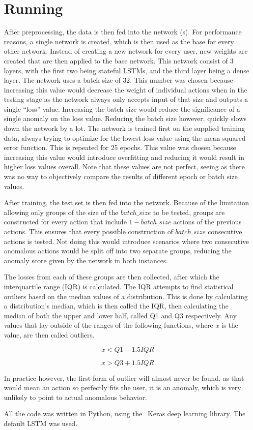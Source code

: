 \section{Running}
After preprocessing, the data is then fed into the network (s). For performance reasons, a single network is created, which is then used as the base for every other network. Instead of creating a new network for every user, new weights are created that are then applied to the base network. This network consist of 3 layers, with the first two being stateful LSTMs, and the third layer being a dense layer. The network uses a batch size of 32. This number was chosen because increasing this value would decrease the weight of individual actions when in the testing stage as the network always only accepts input of that size and outputs a single \enquote{loss} value. Increasing the batch size would reduce the significance of a single anomaly on the loss value. Reducing the batch size however, quickly slows down the network by a lot. The network is trained first on the supplied training data, always trying to optimize for the lowest loss value using the mean squared error function. This is repeated for 25 epochs. This value was chosen because increasing this value would introduce overfitting and reducing it would result in higher loss values overall. Note that these values are not perfect, seeing as there was no way to objectively compare the results of different epoch or batch size values. 

After training, the test set is then fed into the network. Because of the limitation allowing only groups of the size of the $batch\_size$ to be tested, groups are constructed for every action that include $1 - batch\_size$ actions of the previous actions. This ensures that every possible construction of $batch\_size$ consecutive actions is tested. Not doing this would introduce scenarios where two consecutive anomalous actions would be split off into two separate groups, reducing the anomaly score given by the network in both instances.

The losses from each of these groups are then collected, after which the interquartile range (IQR) is calculated. The IQR attempts to find statistical outliers based on the median values of a distribution. This is done by calculating a distribution's median, which is then called the IQR, then calculating the median of both the upper and lower half, called Q1 and Q3 respectively. Any values that lay outside of the ranges of the following functions, where $x$ is the value, are then called outliers.

$$ x < Q1 - 1.5 IQR $$

$$ x > Q3 + 1.5 IQR $$

In practice however, the first form of outlier will almost never be found, as that would mean an action so perfectly fits the user, it is an anomaly, which is very unlikely to point to actual anomalous behavior.

All the code was written in Python, using the~\cite{chollet2015keras} Keras deep learning library. The default LSTM was used.